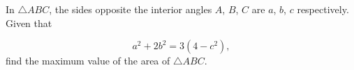 In $\triangle ABC$, the sides opposite the interior angles $A$, $B$, $C$ are $a$, $b$, $c$ respectively. Given that

\[
a^2 + 2b^2 = 3(4 - c^2),
\]find the maximum value of the area of $\triangle ABC$.
